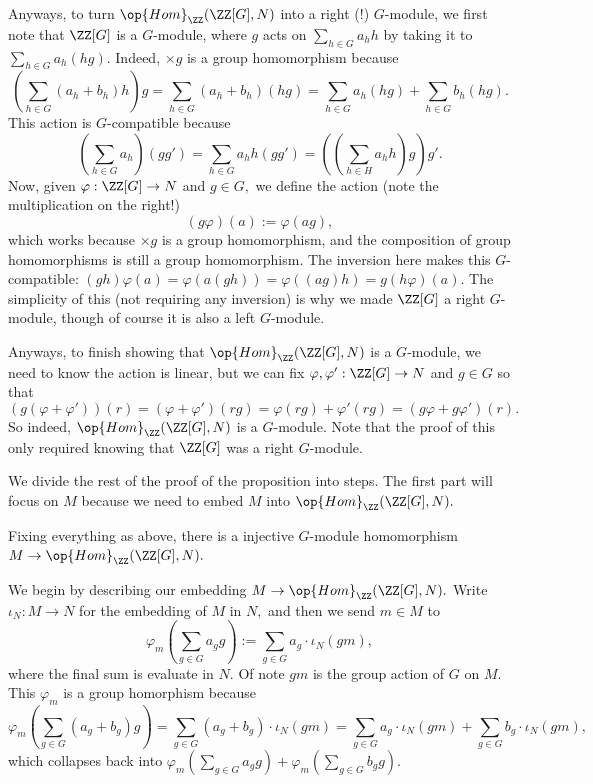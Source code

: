 Anyways, to turn $\op{Hom}_\ZZ(\ZZ[G],N)$ into a right (!) $G$-module, we first note that $\ZZ[G]$ is a $G$-module, where $g$ acts on $\sum_{h\in G}a_hh$ by taking it to $\sum_{h\in G}a_h(hg).$ Indeed, $\times g$ is a group homomorphism because
\[\left(\sum_{h\in G}(a_h+b_h)h\right)g=\sum_{h\in G}(a_h+b_h)(hg)=\sum_{h\in G}a_h(hg)+\sum_{h\in G}b_h(hg).\]
This action is $G$-compatible because
\[\left(\sum_{h\in G}a_h\right)(gg')=\sum_{h\in G}a_hh(gg')=\left(\left(\sum_{h\in H}a_hh\right)g\right)g'.\]
Now, given $\varphi:\ZZ[G]\to N$ and $g\in G,$ we define the action (note the multiplication on the right!)
\[(g\varphi)(a):=\varphi(ag),\]
which works because $\times g$ is a group homomorphism, and the composition of group homomorphisms is still a group homomorphism. The inversion here makes this $G$-compatible: $(gh)\varphi(a)=\varphi\left(a(gh)\right)=\varphi\left((ag)h\right)=g(h\varphi)(a).$ The simplicity of this (not requiring any inversion) is why we made $\ZZ[G]$ a right $G$-module, though of course it is also a left $G$-module.

Anyways, to finish showing that $\op{Hom}_\ZZ(\ZZ[G],N)$ is a $G$-module, we need to know the action is linear, but we can fix $\varphi,\varphi':\ZZ[G]\to N$ and $g\in G$ so that
\[(g(\varphi+\varphi'))(r)=(\varphi+\varphi')(rg)=\varphi(rg)+\varphi'(rg)=(g\varphi+g\varphi')(r).\]
So indeed, $\op{Hom}_\ZZ(\ZZ[G],N)$ is a $G$-module. Note that the proof of this only required knowing that $\ZZ[G]$ was a right $G$-module.

We divide the rest of the proof of the proposition into steps. The first part will focus on $M$ because we need to embed $M$ into $\op{Hom}_\ZZ(\ZZ[G],N).$
\begin{lemma}
    Fixing everything as above, there is a injective $G$-module homomorphism $M\to\op{Hom}_\ZZ(\ZZ[G],N).$
\end{lemma}
We begin by describing our embedding $M\to\op{Hom}_\ZZ(\ZZ[G],N).$ Write $\iota_N:M\to N$ for the embedding of $M$ in $N,$ and then we send $m\in M$ to
\[\varphi_m\left(\sum_{g\in G}a_gg\right):=\sum_{g\in G}a_g\cdot\iota_N(gm),\]
where the final sum is evaluate in $N.$ Of note $gm$ is the group action of $G$ on $M.$ This $\varphi_m$ is a group homorphism because
\[\varphi_m\left(\sum_{g\in G}(a_g+b_g)g\right)=\sum_{g\in G}(a_g+b_g)\cdot\iota_N(gm)=\sum_{g\in G}a_g\cdot\iota_N(gm)+\sum_{g\in G}b_g\cdot\iota_N(gm),\]
which collapses back into $\varphi_m\left(\sum_{g\in G}a_gg\right)+\varphi_m\left(\sum_{g\in G}b_gg\right).$

